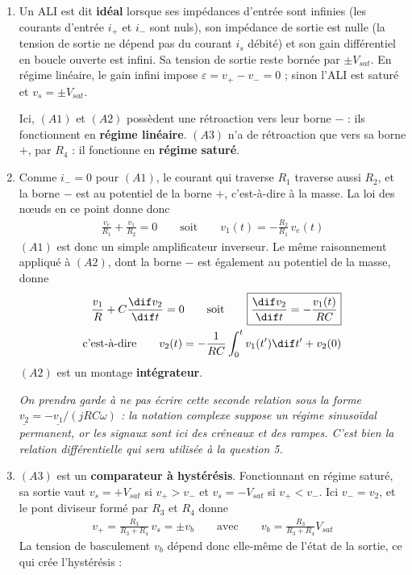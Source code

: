 \begin{correction}

    \begin{enumerate}

        \item Un ALI est dit \textbf{idéal} lorsque ses impédances d'entrée sont infinies (les courants d'entrée $i_+$ et $i_-$ sont nuls), son impédance de sortie est nulle (la tension de sortie ne dépend pas du courant $i_s$ débité) et son gain différentiel en boucle ouverte est infini. Sa tension de sortie reste bornée par $\pm V_{sat}$. En régime linéaire, le gain infini impose $\varepsilon=v_+-v_-=0$ ; sinon l'ALI est saturé et $v_s=\pm V_{sat}$.

        Ici, $(A1)$ et $(A2)$ possèdent une rétroaction vers leur borne $-$ : ils fonctionnent en \textbf{régime linéaire}. $(A3)$ n'a de rétroaction que vers sa borne $+$, par $R_4$ : il fonctionne en \textbf{régime saturé}.

        \item Comme $i_-=0$ pour $(A1)$, le courant qui traverse $R_1$ traverse aussi $R_2$, et la borne $-$ est au potentiel de la borne $+$, c'est-à-dire à la masse. La loi des n\oe uds en ce point donne donc
        \begin{align*}
            \frac{v_e}{R_1}+\frac{v_1}{R_2}=0
            \qquad\text{soit}\qquad
            \boxed{v_1(t)=-\frac{R_2}{R_1}\,v_e(t)}
        \end{align*}
        $(A1)$ est donc un simple amplificateur inverseur. Le même raisonnement appliqué à $(A2)$, dont la borne $-$ est également au potentiel de la masse, donne
        \begin{align*}
            \frac{v_1}{R}+C\frac{\dif v_2}{\dif t}=0
            \qquad\text{soit}\qquad
            \boxed{\frac{\dif v_2}{\dif t}=-\frac{v_1(t)}{RC}} \\
            \text{c'est-à-dire}\qquad
            v_2(t)=-\frac{1}{RC}\int_0^{t}v_1(t')\dif t'+v_2(0)
        \end{align*}
        $(A2)$ est un montage \textbf{intégrateur}.

        \textit{On prendra garde à ne pas écrire cette seconde relation sous la forme $\underline{v_2}=-\underline{v_1}/(jRC\omega)$ : la notation complexe suppose un régime sinusoïdal permanent, or les signaux sont ici des créneaux et des rampes. C'est bien la relation différentielle qui sera utilisée à la question 5.}

        \item $(A3)$ est un \textbf{comparateur à hystérésis}. Fonctionnant en régime saturé, sa sortie vaut $v_s=+V_{sat}$ si $v_+>v_-$ et $v_s=-V_{sat}$ si $v_+<v_-$. Ici $v_-=v_2$, et le pont diviseur formé par $R_3$ et $R_4$ donne
        \begin{align*}
            v_+=\frac{R_3}{R_3+R_4}\,v_s=\pm v_b
            \qquad\text{avec}\qquad
            v_b=\frac{R_3}{R_3+R_4}V_{sat}
        \end{align*}
        La tension de basculement $v_b$ dépend donc elle-même de l'état de la sortie, ce qui crée l'hystérésis :


\end{enumerate}
\end{correction}
